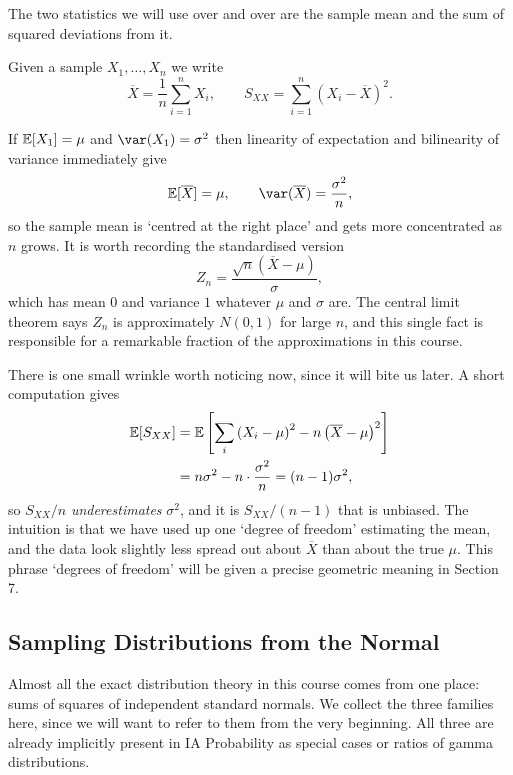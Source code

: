 \documentclass[a4paper]{scrartcl}
\begin{document}
The two statistics we will use over and over are the sample mean and the sum of squared deviations from it.

\begin{definition}
  Given a sample $X_1, \dots, X_n$ we write
  $$
  \overline{X} = \frac{1}{n} \sum_{i = 1}^{n} X_i, \qquad S_{XX} = \sum_{i = 1}^{n} \left(X_i - \overline{X}\right)^2.
  $$
\end{definition}

If $\mathbb{E}[X_1] = \mu$ and $\var(X_1) = \sigma^2$ then linearity of expectation and bilinearity of variance immediately give
$$
\EE[\overline{X}] = \mu, \qquad \var(\overline{X}) = \frac{\sigma^2}{n},
$$
so the sample mean is `centred at the right place' and gets more concentrated as $n$ grows. It is worth recording the standardised version
$$
Z_n = \frac{\sqrt{n}\left(\overline{X} - \mu\right)}{\sigma},
$$
which has mean $0$ and variance $1$ whatever $\mu$ and $\sigma$ are. The central limit theorem says $Z_n$ is approximately $N(0,1)$ for large $n$, and this single fact is responsible for a remarkable fraction of the approximations in this course.

There is one small wrinkle worth noticing now, since it will bite us later. A short computation gives
\begin{align*}
  \mathbb{E}[S_{XX}] &= \mathbb{E}\left[\sum_i \left(X_i - \mu\right)^2 - n \left(\overline{X} - \mu\right)^2 \right]\\
  &= n \sigma^2 - n \cdot \frac{\sigma^2}{n} = (n-1)\sigma^2,
\end{align*}
so $S_{XX}/n$ \emph{underestimates} $\sigma^2$, and it is $S_{XX}/(n-1)$ that is unbiased. The intuition is that we have used up one `degree of freedom' estimating the mean, and the data look slightly less spread out about $\overline{X}$ than about the true $\mu$. This phrase `degrees of freedom' will be given a precise geometric meaning in Section 7.

\subsection{Sampling Distributions from the Normal}

Almost all the exact distribution theory in this course comes from one place: sums of squares of independent standard normals. We collect the three families here, since we will want to refer to them from the very beginning. All three are already implicitly present in IA Probability as special cases or ratios of gamma distributions.
\end{document}
